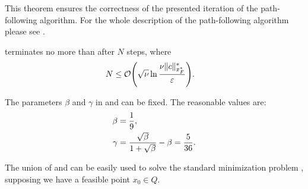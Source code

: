 This theorem ensures the correctness of the presented iteration of the path-following algorithm.
For the whole description of the path-following algorithm please see .



\begin{theorem}
   terminates no more than after $N$ steps, where
  \begin{align}
    N &\leq \mathcal{O}\Bigg(\sqrt{\nu}\ln\frac{\nu \|c\|^*_{x^*_F}}{\varepsilon}\Bigg).\labeleq{SDP:scb:pfSteps}
  \end{align}
\end{theorem}

The parameters $\beta$ and $\gamma$ in  and  can be fixed. The reasonable values are:
\begin{align}
  \beta &= \frac{1}{9},\labeleq{SDP:scb:beta}\\
  \gamma &= \frac{\sqrt{\beta}}{1+\sqrt{\beta}} - \beta = \frac{5}{36}.\labeleq{SDP:scb:gamma}
\end{align}

The union of  and  can be easily used to solve the standard minimization problem , supposing we have a feasible point $x_0\in Q$.

